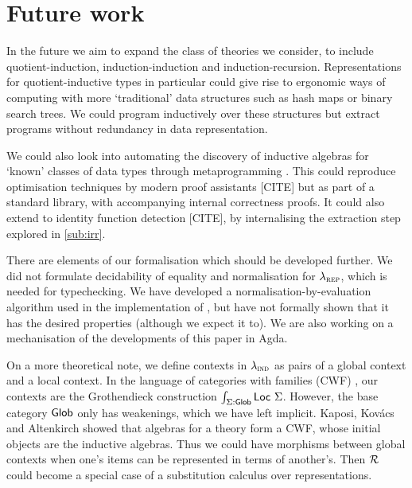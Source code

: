 \section{Future work}


In the future we aim to expand the class of theories we consider, to include
quotient-induction, induction-induction and induction-recursion. Representations
for quotient-inductive types in particular could give rise to ergonomic ways of
computing with more `traditional' data structures such as hash maps or binary
search trees. We could program inductively over these structures but extract
programs without redundancy in data representation.

We could also look into automating the discovery of inductive algebras for
`known' classes of data types through metaprogramming \cite{Dagand2017-nj}. This
could reproduce optimisation techniques by modern proof assistants [CITE] but as
part of a standard library, with accompanying internal correctness proofs. It
could also extend to identity function detection [CITE], by internalising the
extraction step explored in \cref{sub:irr}.

There are elements of our formalisation which should be developed further. We
did not formulate decidability of equality and normalisation for $\lambda_{\textsc{rep}}$,
which is needed for typechecking. We have developed a
normalisation-by-evaluation \cite{Altenkirch2020-rm} algorithm used in the
implementation of \superfluid, but have not formally shown that it has the
desired properties (although we expect it to). We are also working on a
mechanisation of the developments of this paper in Agda.



On a more theoretical note, we define contexts in $\lambda_{\textsc{ind}}$ as pairs of a
global context and a local context. In the language of categories with
families (CWF) \cite{Castellan2019-qo}, our contexts are the Grothendieck
construction $\int _{\Sigma : \textsf{Glob}} \textsf{Loc}\ \Sigma$. However, the base
category $\textsf{Glob}$ only has weakenings, which we have left implicit.
Kaposi, Kov\'acs and Altenkirch \cite{Kaposi2019-pj} showed that algebras for a
theory form a CWF, whose initial objects are the inductive algebras. Thus we
could have morphisms between global contexts when one's items can be represented
in terms of another's. Then $\mathcal{R}$ could become a special case of a substitution
calculus over representations.

